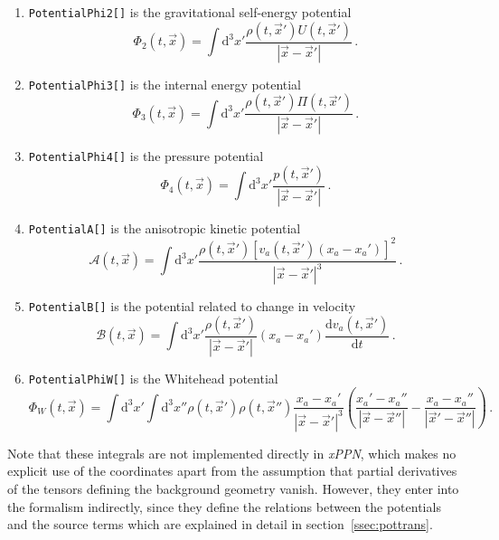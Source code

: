 \documentclass[notitlepage,a4paper,aps,prd,onecolumn,superscriptaddress,nofootinbib,groupedaddress,longbibliography]{revtex4-1}
\newcommand{\dd}{\mathrm{d}}
\newcommand{\xPPN}{\emph{xPPN}}
\begin{document}
\begin{enumerate}
\item
\lstinline/PotentialPhi2[]/ is the gravitational self-energy potential
\begin{equation}
\Phi_2(t, \vec{x}) = \int \dd^3x'\frac{\rho(t, \vec{x}')U(t, \vec{x}')}{|\vec{x} - \vec{x}'|}\,.
\end{equation}
\item
\lstinline/PotentialPhi3[]/ is the internal energy potential
\begin{equation}
\Phi_3(t, \vec{x}) = \int \dd^3x'\frac{\rho(t, \vec{x}')\Pi(t, \vec{x}')}{|\vec{x} - \vec{x}'|}\,.
\end{equation}
\item
\lstinline/PotentialPhi4[]/ is the pressure potential
\begin{equation}
\Phi_4(t, \vec{x}) = \int \dd^3x'\frac{p(t, \vec{x}')}{|\vec{x} - \vec{x}'|}\,.
\end{equation}
\item
\lstinline/PotentialA[]/ is the anisotropic kinetic potential
\begin{equation}
\mathcal{A}(t, \vec{x}) = \int \dd^3x'\frac{\rho(t, \vec{x}')\left[v_a(t, \vec{x}')(x_a - x_a')\right]^2}{|\vec{x} - \vec{x}'|^3}\,.
\end{equation}
\item
\lstinline/PotentialB[]/ is the potential related to change in velocity
\begin{equation}
\mathcal{B}(t, \vec{x}) = \int \dd^3x'\frac{\rho(t, \vec{x}')}{|\vec{x} - \vec{x}'|}(x_a - x_a')\frac{\dd v_a(t, \vec{x}')}{\dd t}\,.
\end{equation}
\item
\lstinline/PotentialPhiW[]/ is the Whitehead potential
\begin{equation}
\Phi_W(t, \vec{x}) = \int \dd^3x'\int \dd^3x''\rho(t, \vec{x}')\rho(t, \vec{x}'')\frac{x_a - x_a'}{|\vec{x} - \vec{x}'|^3}\left(\frac{x_a' - x_a''}{|\vec{x} - \vec{x}''|} - \frac{x_a - x_a''}{|\vec{x}' - \vec{x}''|}\right)\,.
\end{equation}
\end{enumerate}
Note that these integrals are not implemented directly in \xPPN, which makes no explicit use of the coordinates apart from the assumption that partial derivatives of the tensors defining the background geometry vanish. However, they enter into the formalism indirectly, since they define the relations between the potentials and the source terms which are explained in detail in section~\ref{ssec:pottrans}.
\end{document}
